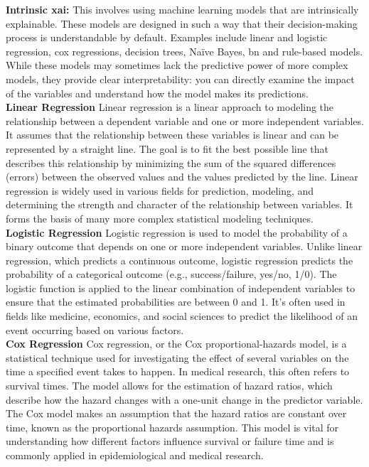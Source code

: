 \textbf{Intrinsic \ac{xai}:} This involves using machine learning models that are intrinsically explainable. These models are designed in such a way that their decision-making process is understandable by default. Examples include linear and logistic regression, cox regressions, decision trees, Naïve Bayes, \ac{bn} and rule-based models. While these models may sometimes lack the predictive power of more complex models, they provide clear interpretability: you can directly examine the impact of the variables and understand how the model makes its predictions.
\\
\textbf{Linear Regression}
Linear regression is a linear approach to modeling the relationship between a dependent variable and one or more independent variables. It assumes that the relationship between these variables is linear and can be represented by a straight line. The goal is to fit the best possible line that describes this relationship by minimizing the sum of the squared differences (errors) between the observed values and the values predicted by the line. Linear regression is widely used in various fields for prediction, modeling, and determining the strength and character of the relationship between variables. It forms the basis of many more complex statistical modeling techniques.
\\
\textbf{Logistic Regression}
Logistic regression is used to model the probability of a binary outcome that depends on one or more independent variables. Unlike linear regression, which predicts a continuous outcome, logistic regression predicts the probability of a categorical outcome (e.g., success/failure, yes/no, 1/0). The logistic function is applied to the linear combination of independent variables to ensure that the estimated probabilities are between 0 and 1. It's often used in fields like medicine, economics, and social sciences to predict the likelihood of an event occurring based on various factors.
\\
\textbf{Cox Regression}
Cox regression, or the Cox proportional-hazards model, is a statistical technique used for investigating the effect of several variables on the time a specified event takes to happen. In medical research, this often refers to survival times. The model allows for the estimation of hazard ratios, which describe how the hazard changes with a one-unit change in the predictor variable. The Cox model makes an assumption that the hazard ratios are constant over time, known as the proportional hazards assumption. This model is vital for understanding how different factors influence survival or failure time and is commonly applied in epidemiological and medical research.

